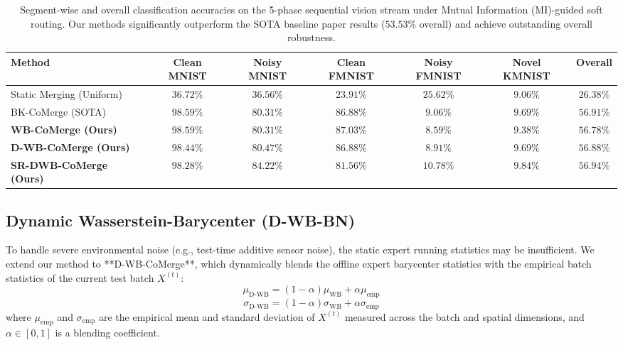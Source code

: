 \documentclass{article}
\theoremstyle{plain}
\theoremstyle{definition}
\theoremstyle{remark}
\begin{document}
\begin{table}[t]
  \caption{Segment-wise and overall classification accuracies on the 5-phase sequential vision stream under Mutual Information (MI)-guided soft routing. Our methods significantly outperform the SOTA baseline paper results ($53.53\%$ overall) and achieve outstanding overall robustness.}
  \label{tab:results}
  \vskip 0.1in
  \begin{center}
    \begin{small}
    \setlength{\tabcolsep}{3.0pt}
      \begin{tabular}{lcccccc}
        \toprule
        Method & Clean MNIST & Noisy MNIST & Clean FMNIST & Noisy FMNIST & Novel KMNIST & Overall \\
        \midrule
        Static Merging (Uniform) & $36.72\%$ & $36.56\%$ & $23.91\%$ & $25.62\%$ & $9.06\%$ & $26.38\%$ \\
        BK-CoMerge (SOTA) & $98.59\%$ & $80.31\%$ & $86.88\%$ & $9.06\%$ & $9.69\%$ & $56.91\%$ \\
        \midrule
        \textbf{WB-CoMerge (Ours)} & $98.59\%$ & $80.31\%$ & $\mathbf{87.03\%}$ & $8.59\%$ & $9.38\%$ & $56.78\%$ \\
        \textbf{D-WB-CoMerge (Ours)} & $98.44\%$ & $80.47\%$ & $86.88\%$ & $8.91\%$ & $9.69\%$ & $56.88\%$ \\
        \textbf{SR-DWB-CoMerge (Ours)} & $\mathbf{98.28\%}$ & $\mathbf{84.22\%}$ & $81.56\%$ & $\mathbf{10.78\%}$ & $\mathbf{9.84\%}$ & $\mathbf{56.94\%}$ \\
        \bottomrule
      \end{tabular}
    \end{small}
  \end{center}
  \vskip -0.1in
\end{table}

\subsection{Dynamic Wasserstein-Barycenter (D-WB-BN)}
To handle severe environmental noise (e.g., test-time additive sensor noise), the static expert running statistics may be insufficient. We extend our method to **D-WB-CoMerge**, which dynamically blends the offline expert barycenter statistics with the empirical batch statistics of the current test batch $X^{(t)}$:
\begin{equation}
  \mu_{\text{D-WB}} = (1 - \alpha) \mu_{\text{WB}} + \alpha \mu_{\text{emp}}
\end{equation}
\begin{equation}
  \sigma_{\text{D-WB}} = (1 - \alpha) \sigma_{\text{WB}} + \alpha \sigma_{\text{emp}}
\end{equation}
where $\mu_{\text{emp}}$ and $\sigma_{\text{emp}}$ are the empirical mean and standard deviation of $X^{(t)}$ measured across the batch and spatial dimensions, and $\alpha \in [0, 1]$ is a blending coefficient.
\end{document}
